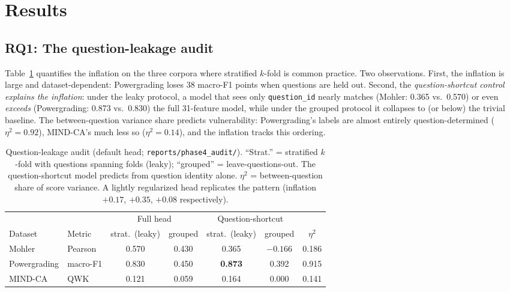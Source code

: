 \documentclass[11pt]{article}
\begin{document}
\section{Results}
\label{sec:results}

\subsection{RQ1: The question-leakage audit}
\label{sec:results-leakage}

Table~\ref{tab:leakage} quantifies the inflation on the three corpora where
stratified $k$-fold is common practice. Two observations. First, the inflation
is large and dataset-dependent: Powergrading loses 38 macro-F1 points when
questions are held out. Second, the \emph{question-shortcut control explains
the inflation}: under the leaky protocol, a model that sees only
\texttt{question\_id} nearly matches (Mohler: 0.365 vs.\ 0.570) or even
\emph{exceeds} (Powergrading: 0.873 vs.\ 0.830) the full 31-feature model,
while under the grouped protocol it collapses to (or below) the trivial
baseline. The between-question variance share predicts vulnerability:
Powergrading's labels are almost entirely question-determined
($\eta^2{=}0.92$), MIND-CA's much less so ($\eta^2{=}0.14$), and the
inflation tracks this ordering.

\begin{table}[t]
\centering\small
\begin{tabular}{llccccc}
\toprule
& & \multicolumn{2}{c}{Full head} & \multicolumn{2}{c}{Question-shortcut} & \\
\cmidrule(lr){3-4}\cmidrule(lr){5-6}
Dataset & Metric & strat.\ (leaky) & grouped & strat.\ (leaky) & grouped & $\eta^2$ \\
\midrule
Mohler       & Pearson  & 0.570 & 0.430 & 0.365 & $-0.166$ & 0.186 \\
Powergrading & macro-F1 & 0.830 & 0.450 & \textbf{0.873} & 0.392 & 0.915 \\
MIND-CA      & QWK      & 0.121 & 0.059 & 0.164 & 0.000 & 0.141 \\
\bottomrule
\end{tabular}
\caption{Question-leakage audit (default head; \texttt{reports/phase4\_audit/}).
``Strat.'' = stratified $k$-fold with questions spanning folds (leaky);
``grouped'' = leave-questions-out. The question-shortcut model predicts from
question identity alone. $\eta^2$ = between-question share of score variance.
A lightly regularized head replicates the pattern (inflation $+0.17$, $+0.35$,
$+0.08$ respectively).}
\label{tab:leakage}
\end{table}
\end{document}
